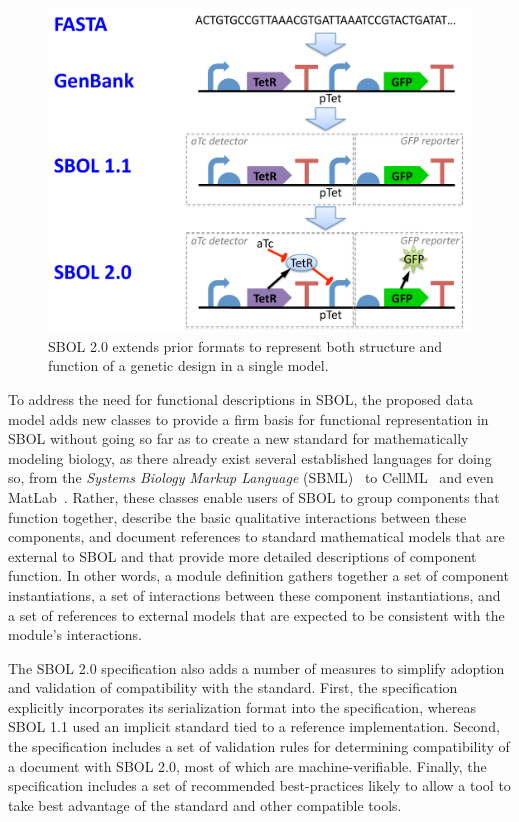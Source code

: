 \begin{figure}
\centering
\includegraphics[width=5in]{images/format-comparison.pdf}
\caption{SBOL 2.0 extends prior formats to represent both structure and function of a genetic design in a single model.}
\end{figure}


To address the need for functional descriptions in SBOL, the proposed data model adds new classes to provide a firm basis for functional representation in SBOL without going so far as to create a new standard for mathematically modeling biology, as there already exist several established languages for doing so, from the \emph{Systems Biology Markup Language} (SBML)~\cite{SBML} to CellML~\cite{CellML} and even MatLab~\cite{matlab}. Rather, these classes enable users of SBOL to group components that function together, describe the basic qualitative interactions between these components, and document references to standard mathematical models that are external to SBOL and that provide more detailed descriptions of component function. In other words, a module definition gathers together a set of component instantiations, a set of interactions between these component instantiations, and a set of references to external models that are expected to be consistent with the module's interactions.

The SBOL 2.0 specification also adds a number of measures to simplify adoption and validation of compatibility with the standard.
First, the specification explicitly incorporates its serialization format into the specification, whereas SBOL 1.1 used an implicit standard tied to a reference implementation.
Second, the specification includes a set of validation rules for determining compatibility of a document with SBOL 2.0, most of which are machine-verifiable.
Finally, the specification includes a set of recommended best-practices likely to allow a tool to take best advantage of the standard and other compatible tools.

